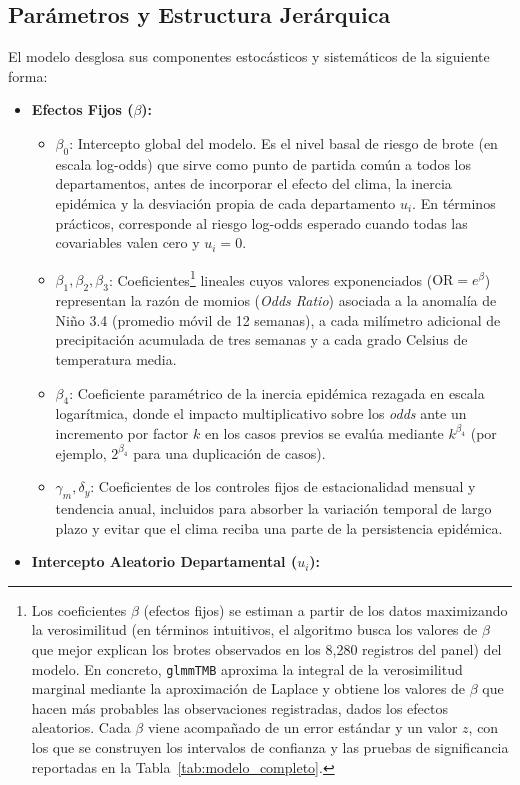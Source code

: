 \documentclass[11pt,a4paper]{article}
\begin{document}
\subsection{Parámetros y Estructura Jerárquica}
El modelo desglosa sus componentes estocásticos y sistemáticos de la siguiente forma:
\begin{itemize}
	\item \textbf{Efectos Fijos ($\beta$):}
	\begin{itemize}
		\item $\beta_0$: Intercepto global del modelo. Es el nivel basal de riesgo de brote (en escala log-odds) que sirve como punto de partida común a todos los departamentos, antes de incorporar el efecto del clima, la inercia epidémica y la desviación propia de cada departamento $u_i$. En términos prácticos, corresponde al riesgo log-odds esperado cuando todas las covariables valen cero y $u_i = 0$.
		\item $\beta_1, \beta_2, \beta_3$: Coeficientes\footnote{Los coeficientes $\beta$ (efectos fijos) se estiman a partir de los datos maximizando la verosimilitud (en términos intuitivos, el algoritmo busca los valores de $\beta$ que mejor explican los brotes observados en los 8,280 registros del panel) del modelo. En concreto, \texttt{glmmTMB} \parencite{brooks2017glmmtmb} aproxima la integral de la verosimilitud marginal mediante la aproximación de Laplace y obtiene los valores de $\beta$ que hacen más probables las observaciones registradas, dados los efectos aleatorios. Cada $\beta$ viene acompañado de un error estándar y un valor $z$, con los que se construyen los intervalos de confianza y las pruebas de significancia reportadas en la Tabla~\ref{tab:modelo_completo}.} lineales cuyos valores exponenciados ($\text{OR} = e^\beta$) representan la razón de momios (\textit{Odds Ratio}) asociada a la anomalía de Niño 3.4 (promedio móvil de 12 semanas), a cada milímetro adicional de precipitación acumulada de tres semanas y a cada grado Celsius de temperatura media.
		\item $\beta_4$: Coeficiente paramétrico de la inercia epidémica rezagada en escala logarítmica, donde el impacto multiplicativo sobre los \textit{odds} ante un incremento por factor $k$ en los casos previos se evalúa mediante $k^{\beta_4}$ (por ejemplo, $2^{\beta_4}$ para una duplicación de casos).
		\item $\gamma_m, \delta_y$: Coeficientes de los controles fijos de estacionalidad mensual y tendencia anual, incluidos para absorber la variación temporal de largo plazo y evitar que el clima reciba una parte de la persistencia epidémica.
	\end{itemize}
	\item \textbf{Intercepto Aleatorio Departamental ($u_i$):}


\end{itemize}
\end{document}

